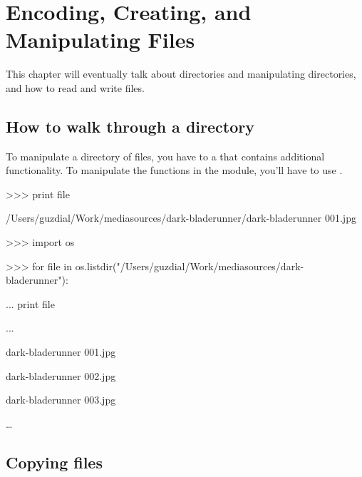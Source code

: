 \chapter{Encoding, Creating, and Manipulating Files}







This chapter will eventually talk about directories and manipulating directories, and how to read and write files.



\section{How to walk through a directory}





To manipulate a directory of files, you have to  a  that contains additional functionality.  To manipulate the functions in the module, you'll have to use .



\begin{example}

>>> print file

/Users/guzdial/Work/mediasources/dark-bladerunner/dark-bladerunner 001.jpg

>>> import os

>>> for file in os.listdir("/Users/guzdial/Work/mediasources/dark-bladerunner"):

...    print file

...

dark-bladerunner 001.jpg

dark-bladerunner 002.jpg

dark-bladerunner 003.jpg

\ldots

\end{example}







\section{Copying files}



